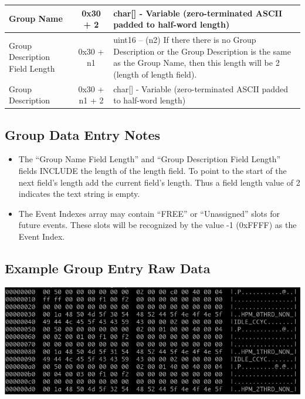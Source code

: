 \documentclass[14]{article}
\begin{document}
\begin{tabular}[l]{|p{5cm}|c|p{7cm}|}
  \hline
  Group Name & 0x30 + 2 & char[] - Variable (zero-terminated ASCII padded to
                          half-word length) \\
  \hline
  Group Description Field Length & 0x30 + n1 & uint16 – (n2) If there there is no
                                               Group Description or the Group
                                               Description is the same as the
                                               Group Name, then this length
                                               will be 2 (length of length
                                               field). \\
  \hline
  Group Description & 0x30 + n1 + 2 & char[] - Variable (zero-terminated ASCII
                                      padded to half-word length) \\
  \hline
\end{tabular}

\subsection{Group Data Entry Notes}
\begin{itemize}
\item The “Group Name Field Length” and “Group Description Field Length” fields
  INCLUDE the length of the length field. To point to the start of the next
  field's length add the current field's length. Thus a field length value of 2
  indicates the text string is empty.
\item The Event Indexes array may contain “FREE” or “Unassigned” slots for
  future events. These slots will be recognized by the value -1 (0xFFFF) as the
  Event Index.
\end{itemize}

\subsection{Example Group Entry Raw Data}
\includegraphics[scale=0.6]{groups_raw.png}
\end{document}
